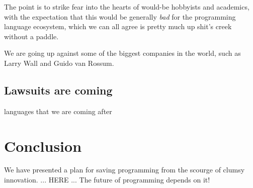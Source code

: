 \documentclass[acmtocl]%
{boviktrans}
\begin{document}
The point is to strike fear into the hearts of would-be hobbyists and
academics, with the expectation that this would be generally {\it bad}
for the programming language ecosystem, which we can all agree is
pretty much up shit's creek without a paddle.

We are going up against some of the biggest companies in the world,
such as Larry Wall and Guido van Rossum.


\subsection{Lawsuits are coming}

languages that we are coming after


\section{Conclusion}

We have presented a plan for saving programming from the scourge of clumsy innovation. 
... HERE ...
The future of programming depends on it!
\end{document}
